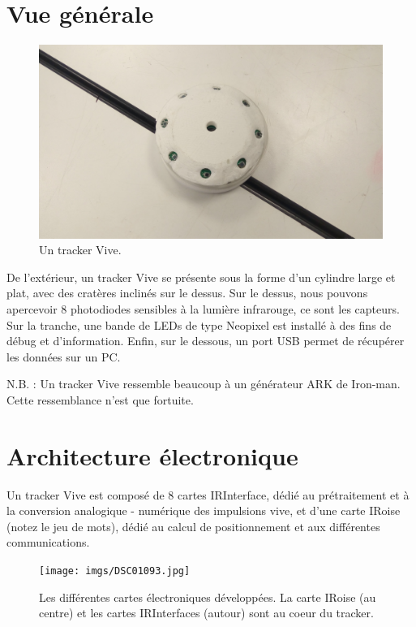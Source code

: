 ﻿\section{Vue générale}

\begin{figure}[ht]
\begin{center}
\includegraphics[scale=0.05]{imgs/IMG_20180525_120520.jpg}
\end{center}
\caption{Un tracker Vive.}
\end{figure}

De l'extérieur, un tracker Vive se présente sous la forme d'un cylindre large et plat, avec des cratères inclinés sur le dessus. Sur le dessus, nous pouvons apercevoir 8 photodiodes sensibles à la lumière infrarouge, ce sont les capteurs. Sur la tranche, une bande de LEDs de type Neopixel est installé à des fins de débug et d'information. Enfin, sur le dessous, un port USB permet de récupérer les données sur un PC.

N.B. : Un tracker Vive ressemble beaucoup à un générateur ARK de Iron-man. Cette ressemblance n'est que fortuite.

\section{Architecture électronique}

Un tracker Vive est composé de 8 cartes IRInterface, dédié au prétraitement et à la conversion analogique - numérique des impulsions vive, et d'une carte IRoise (notez le jeu de mots), dédié au calcul de positionnement et aux différentes communications.

\begin{figure}[ht]
\begin{center}
\texttt{[image: imgs/DSC01093.jpg]}
\end{center}
\caption{Les différentes cartes électroniques développées. La carte IRoise (au centre) et les cartes IRInterfaces (autour) sont au coeur du tracker.}
\end{figure}

